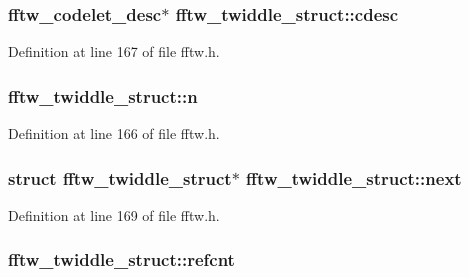 \subsubsection[{\texorpdfstring{cdesc}{cdesc}}]{ {\bf fftw\+\_\+codelet\+\_\+desc}$\ast$ fftw\+\_\+twiddle\+\_\+struct\+::cdesc}\hypertarget{structfftw__twiddle__struct_a54bdb5f494d6265576fbcedc9b8bc513}{}\label{structfftw__twiddle__struct_a54bdb5f494d6265576fbcedc9b8bc513}


Definition at line 167 of file fftw.\+h.

\subsubsection[{\texorpdfstring{n}{n}}]{ fftw\+\_\+twiddle\+\_\+struct\+::n}\hypertarget{structfftw__twiddle__struct_a1ef8adb93bb61bac933d4b59c8031087}{}\label{structfftw__twiddle__struct_a1ef8adb93bb61bac933d4b59c8031087}


Definition at line 166 of file fftw.\+h.

\subsubsection[{\texorpdfstring{next}{next}}]{\setlength{\rightskip}{0pt plus 5cm}struct {\bf fftw\+\_\+twiddle\+\_\+struct}$\ast$ fftw\+\_\+twiddle\+\_\+struct\+::next}\hypertarget{structfftw__twiddle__struct_a6bb8fd55d4b24190d2899f753ef94eaf}{}\label{structfftw__twiddle__struct_a6bb8fd55d4b24190d2899f753ef94eaf}


Definition at line 169 of file fftw.\+h.

\subsubsection[{\texorpdfstring{refcnt}{refcnt}}]{ fftw\+\_\+twiddle\+\_\+struct\+::refcnt}\hypertarget{structfftw__twiddle__struct_ab6c2135b5ccb5c2941b0e48eeb10cd08}{}\label{structfftw__twiddle__struct_ab6c2135b5ccb5c2941b0e48eeb10cd08}


